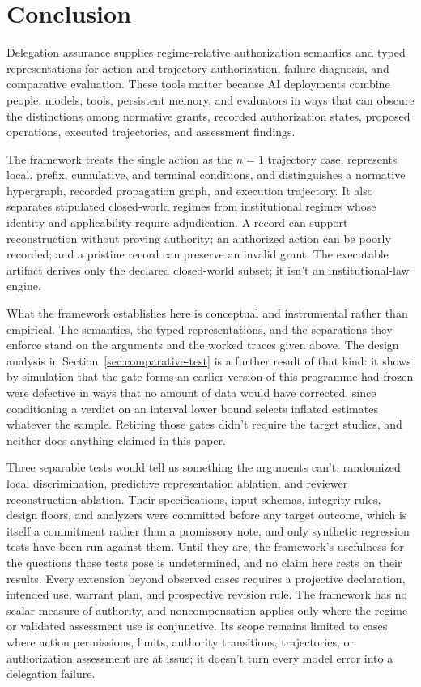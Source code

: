 \section{Conclusion}

Delegation assurance supplies regime-relative authorization semantics and typed representations for action and trajectory authorization, failure diagnosis, and comparative evaluation. These tools matter because AI deployments combine people, models, tools, persistent memory, and evaluators in ways that can obscure the distinctions among normative grants, recorded authorization states, proposed operations, executed trajectories, and assessment findings.

The framework treats the single action as the \(n=1\) trajectory case, represents local, prefix, cumulative, and terminal conditions, and distinguishes a normative hypergraph, recorded propagation graph, and execution trajectory. It also separates stipulated closed-world regimes from institutional regimes whose identity and applicability require adjudication. A record can support reconstruction without proving authority; an authorized action can be poorly recorded; and a pristine record can preserve an invalid grant. The executable artifact derives only the declared closed-world subset; it isn't an institutional-law engine.

What the framework establishes here is conceptual and instrumental rather than empirical. The semantics, the typed representations, and the separations they enforce stand on the arguments and the worked traces given above. The design analysis in Section~\ref{sec:comparative-test} is a further result of that kind: it shows by simulation that the gate forms an earlier version of this programme had frozen were defective in ways that no amount of data would have corrected, since conditioning a verdict on an interval lower bound selects inflated estimates whatever the sample. Retiring those gates didn't require the target studies, and neither does anything claimed in this paper.

Three separable tests would tell us something the arguments can't: randomized local discrimination, predictive representation ablation, and reviewer reconstruction ablation. Their specifications, input schemas, integrity rules, design floors, and analyzers were committed before any target outcome, which is itself a commitment rather than a promissory note, and only synthetic regression tests have been run against them. Until they are, the framework's usefulness for the questions those tests pose is undetermined, and no claim here rests on their results. Every extension beyond observed cases requires a projective declaration, intended use, warrant plan, and prospective revision rule. The framework has no scalar measure of authority, and noncompensation applies only where the regime or validated assessment use is conjunctive. Its scope remains limited to cases where action permissions, limits, authority transitions, trajectories, or authorization assessment are at issue; it doesn't turn every model error into a delegation failure.
